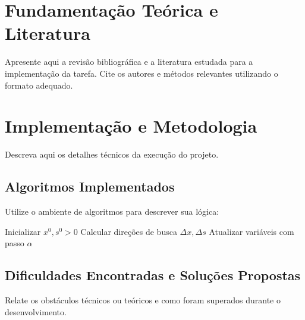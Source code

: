 \documentclass[11pt, letterpaper]{article}
\begin{document}
\begin{center}
\vspace{1.5cm}

\begin{abstract}
\normalsize
\textbf{Resumo das Técnicas e Resultados:} Utilizando os métodos de pontos interiores para otimização linear como solução para resolver grandes problemas que envolvem matrizes esparsas, analisamos a redução do tempo computacional por iteração entre os projetos PCx0 e PCx13, reduzindo o número de iterações para alcançar a convergência de métodos e o desenvolvimento de métodos para problemas específicos com estruturas particulares.
\end{abstract}

\end{center}

\newpage
{}


\section{Fundamentação Teórica e Literatura}
Apresente aqui a revisão bibliográfica e a literatura estudada para a implementação da tarefa. Cite os autores e métodos relevantes utilizando o formato adequado.

\section{Implementação e Metodologia}
Descreva aqui os detalhes técnicos da execução do projeto.

\subsection{Algoritmos Implementados}
Utilize o ambiente de algoritmos para descrever sua lógica:

\begin{algorithm}
\caption{Método de Pontos Interiores (Exemplo)}
\begin{algorithmic}[1]
\State Inicializar $x^0, s^0 > 0$
    \State Calcular direções de busca $\Delta x, \Delta s$
    \State Atualizar variáveis com passo $\alpha$
\EndWhile
\end{algorithmic}
\end{algorithm}

\subsection{Dificuldades Encontradas e Soluções Propostas}
Relate os obstáculos técnicos ou teóricos e como foram superados durante o desenvolvimento.
\end{document}
